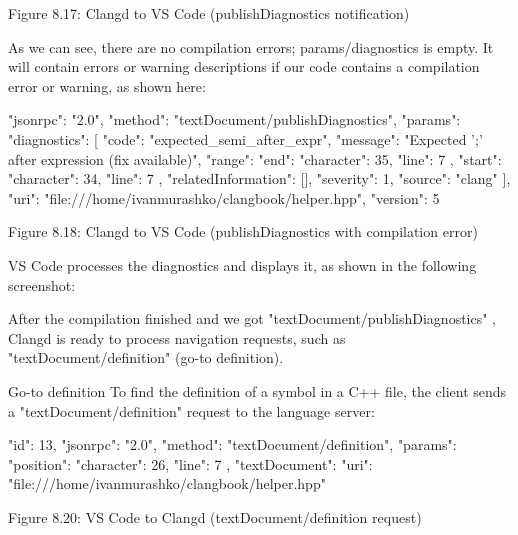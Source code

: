 \begin{center}
Figure 8.17: Clangd to VS Code (publishDiagnostics notification)
\end{center}

As we can see, there are no compilation errors; params/diagnostics is empty. It will contain errors or warning descriptions if our code contains a compilation error or warning, as shown here:

\begin{shell}
{
  "jsonrpc": "2.0",
  "method": "textDocument/publishDiagnostics",
  "params": {
    "diagnostics": [
    {
      "code": "expected_semi_after_expr",
      "message": "Expected ’;’ after expression (fix available)",
      "range": {
        "end": {
          "character": 35,
          "line": 7
        },
        "start": {
          "character": 34,
          "line": 7
        }
      },
      "relatedInformation": [],
      "severity": 1,
      "source": "clang"
    }
    ],
    "uri": "file:///home/ivanmurashko/clangbook/helper.hpp",
    "version": 5
  }
}
\end{shell}

\begin{center}
Figure 8.18: Clangd to VS Code (publishDiagnostics with compilation error)
\end{center}

VS Code processes the diagnostics and displays it, as shown in the following screenshot:


After the compilation finished and we got "textDocument/publishDiagnostics" , Clangd is ready to process navigation requests, such as "textDocument/definition" (go-to definition).

Go-to definition
To find the definition of a symbol in a C++ file, the client sends a "textDocument/definition" request to the language server:

\begin{shell}
{
  "id": 13,
  "jsonrpc": "2.0",
  "method": "textDocument/definition",
  "params": {
    "position": {
      "character": 26,
      "line": 7
    },
    "textDocument": {
       "uri": "file:///home/ivanmurashko/clangbook/helper.hpp"
    }
  }
}
\end{shell}

\begin{center}
Figure 8.20: VS Code to Clangd (textDocument/definition request)
\end{center}

